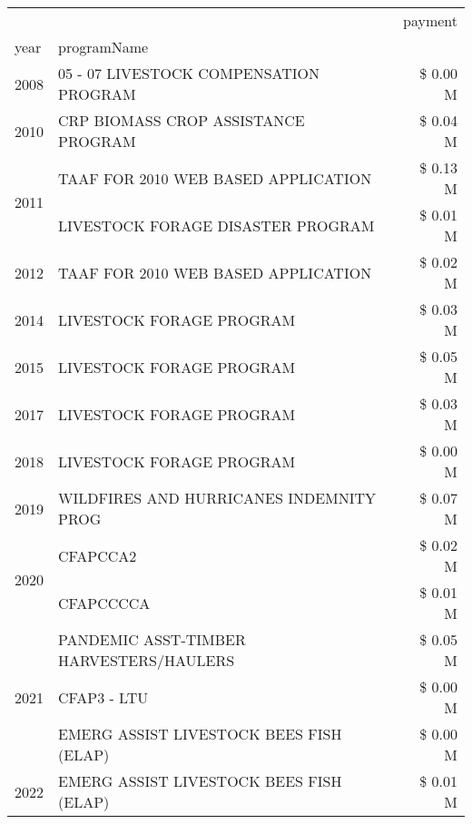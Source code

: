 \begin{tabular}{llr}
\toprule
 &  & payment \\
year & programName &  \\
\midrule
2008 & 05 - 07 LIVESTOCK COMPENSATION PROGRAM & \$ 0.00 M \\
\cline{1-3}
2010 & CRP BIOMASS CROP ASSISTANCE PROGRAM & \$ 0.04 M \\
\cline{1-3}
\multirow[t]{2}{*}{2011} & TAAF FOR 2010 WEB BASED APPLICATION & \$ 0.13 M \\
 & LIVESTOCK FORAGE DISASTER PROGRAM & \$ 0.01 M \\
\cline{1-3}
2012 & TAAF FOR 2010 WEB BASED APPLICATION & \$ 0.02 M \\
\cline{1-3}
2014 & LIVESTOCK FORAGE PROGRAM & \$ 0.03 M \\
\cline{1-3}
2015 & LIVESTOCK FORAGE PROGRAM & \$ 0.05 M \\
\cline{1-3}
2017 & LIVESTOCK FORAGE PROGRAM & \$ 0.03 M \\
\cline{1-3}
2018 & LIVESTOCK FORAGE PROGRAM & \$ 0.00 M \\
\cline{1-3}
2019 & WILDFIRES AND HURRICANES INDEMNITY PROG & \$ 0.07 M \\
\cline{1-3}
\multirow[t]{2}{*}{2020} & CFAPCCA2 & \$ 0.02 M \\
 & CFAPCCCCA & \$ 0.01 M \\
\cline{1-3}
\multirow[t]{3}{*}{2021} & PANDEMIC ASST-TIMBER HARVESTERS/HAULERS & \$ 0.05 M \\
 & CFAP3 - LTU & \$ 0.00 M \\
 & EMERG ASSIST LIVESTOCK BEES FISH (ELAP) & \$ 0.00 M \\
\cline{1-3}
2022 & EMERG ASSIST LIVESTOCK BEES FISH (ELAP) & \$ 0.01 M \\
\cline{1-3}
\bottomrule
\end{tabular}
